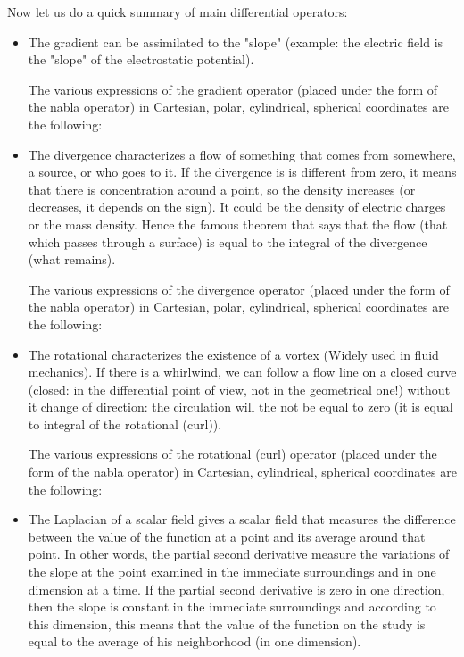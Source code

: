 	
	Now let us do a quick summary of main differential operators:
	\begin{itemize}
		\item The gradient can be assimilated to the "slope" (example: the electric field is the "slope" of the electrostatic potential).
		
		The various expressions of the gradient operator (placed under the form of the nabla operator) in Cartesian, polar, cylindrical, spherical coordinates are the following:
		
		
		\item The divergence characterizes a flow of something that comes from somewhere, a source, or who goes to it. If the divergence is is different from zero, it means that there is concentration around a point, so the density increases (or decreases, it depends on the sign). It could be the density of electric charges or the mass density. Hence the famous theorem that says that the flow (that which passes through a surface) is equal to the integral of the divergence (what remains).
		
		The various expressions of the divergence operator (placed under the form of the nabla operator) in Cartesian, polar, cylindrical, spherical coordinates are the following:
		
		
		\item The rotational characterizes the existence of a vortex (Widely used in fluid mechanics). If there is a whirlwind, we can follow a flow line on a closed curve (closed: in the differential point of view, not in the geometrical one!) without it change of direction: the circulation will the not be equal to zero (it is equal to integral of the rotational (curl)).
		
		The various expressions of the rotational (curl) operator (placed under the form of the nabla operator) in Cartesian, cylindrical, spherical coordinates are the following:
		
		
		\item The Laplacian of a scalar field gives a scalar field that measures the difference between the value of the function at a point and its average around that point. In other words, the partial second derivative measure the variations of the slope at the point examined in the immediate surroundings and in one dimension at a time. If the partial second derivative is zero in one direction, then the slope is constant in the immediate surroundings and according to this dimension, this means that the value of the function on the study is equal to the average of his neighborhood (in one dimension).
		

\end{itemize}
